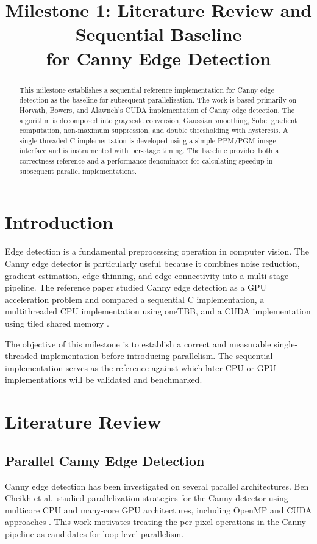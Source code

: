 \documentclass[conference]{IEEEtran}
\title{Milestone 1: Literature Review and Sequential Baseline\\
for Canny Edge Detection}
\author{
\IEEEauthorblockN{Anjali Kamath}
\IEEEauthorblockA{
Department of Computer Science\\
Your University\\
Email: your.email@example.com}
}
\begin{document}
\maketitle

\begin{abstract}
This milestone establishes a sequential reference implementation for Canny
edge detection as the baseline for subsequent parallelization. The work is
based primarily on Horvath, Bowers, and Alawneh's CUDA implementation of
Canny edge detection. The algorithm is decomposed into grayscale conversion,
Gaussian smoothing, Sobel gradient computation, non-maximum suppression,
and double thresholding with hysteresis. A single-threaded C implementation
is developed using a simple PPM/PGM image interface and is instrumented with
per-stage timing. The baseline provides both a correctness reference and a
performance denominator for calculating speedup in subsequent parallel
implementations.
\end{abstract}

\section{Introduction}

Edge detection is a fundamental preprocessing operation in computer vision.
The Canny edge detector is particularly useful because it combines noise
reduction, gradient estimation, edge thinning, and edge connectivity into a
multi-stage pipeline. The reference paper studied Canny edge detection as a
GPU acceleration problem and compared a sequential C implementation, a
multithreaded CPU implementation using oneTBB, and a CUDA implementation
using tiled shared memory \cite{horvath2023}.

The objective of this milestone is to establish a correct and measurable
single-threaded implementation before introducing parallelism. The sequential
implementation serves as the reference against which later CPU or GPU
implementations will be validated and benchmarked.

\section{Literature Review}

\subsection{Parallel Canny Edge Detection}

Canny edge detection has been investigated on several parallel architectures.
Ben Cheikh et al.\ studied parallelization strategies for the Canny detector
using multicore CPU and many-core GPU architectures, including OpenMP and
CUDA approaches \cite{cheikh2012}. This work motivates treating the
per-pixel operations in the Canny pipeline as candidates for loop-level
parallelism.
\end{document}
